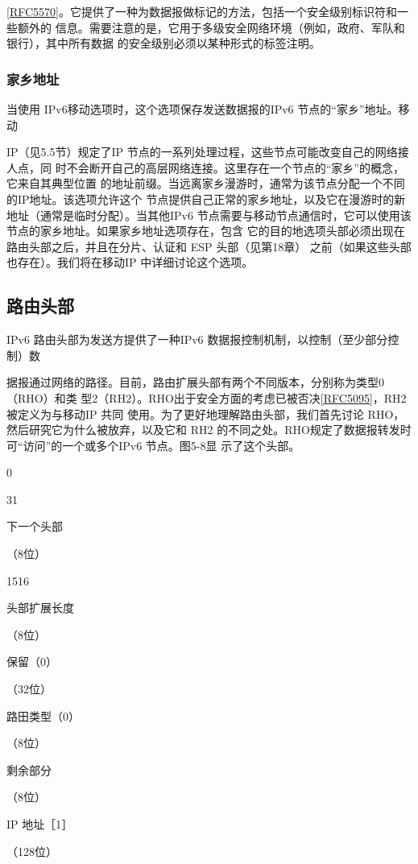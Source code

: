 \href{https://www.rfc-editor.org/rfc/rfc5570}{[RFC5570]}。它提供了一种为数据报做标记的方法，包括一个安全级别标识符和一些额外的
信息。需要注意的是，它用于多级安全网络环境（例如，政府、军队和银行），其中所有数据
的安全级别必须以某种形式的标签注明。

\subsubsection{家乡地址}
当使用 IPv6移动选项时，这个选项保存发送数据报的IPv6 节点的“家乡”地址。移动

IP（见5.5节）规定了IP 节点的一系列处理过程，这些节点可能改变自己的网络接人点，同
时不会断开自己的高层网络连接。这里存在一个节点的“家乡”的概念，它来自其典型位置
的地址前缀。当远离家乡漫游时，通常为该节点分配一个不同的IP地址。该选项允许这个
节点提供自己正常的家乡地址，以及它在漫游时的新地址（通常是临时分配）。当其他IPv6
节点需要与移动节点通信时，它可以使用该节点的家乡地址。如果家乡地址选项存在，包含
它的目的地选项头部必须出现在路由头部之后，并且在分片、认证和 ESP 头部（见第18章）
之前（如果这些头部也存在）。我们将在移动IP 中详细讨论这个选项。

\subsection{路由头部}
IPv6 路由头部为发送方提供了一种IPv6 数据报控制机制，以控制（至少部分控制）数

据报通过网络的路径。目前，路由扩展头部有两个不同版本，分别称为类型0（RHO）和类
型2（RH2）。RHO出于安全方面的考虑已被否决\href{https://www.rfc-editor.org/rfc/rfc5095}{[RFC5095]}，RH2 被定义为与移动IP 共同
使用。为了更好地理解路由头部，我们首先讨论 RHO，然后研究它为什么被放弃，以及它和
RH2 的不同之处。RHO规定了数据报转发时可“访问”的一个或多个IPv6 节点。图5-8显
示了这个头部。

0

31

下一个头部

（8位）

1516

头部扩展长度

（8位）

保留（0）

（32位）

路田类型（0）

（8位）

剩余部分

（8位）

IP 地址［1］

（128位）

